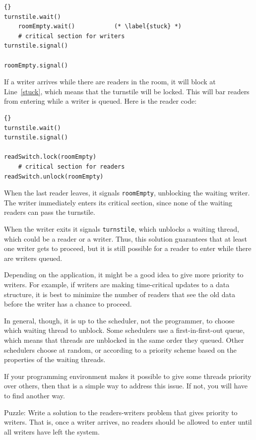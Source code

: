 \documentclass{book}
\begin{document}
\begin{lstlisting}[caption={No-starve writer solution}]{}
turnstile.wait()
    roomEmpty.wait()           (* \label{stuck} *)
    # critical section for writers
turnstile.signal()

roomEmpty.signal()
\end{lstlisting}

If a writer arrives while there are readers in the room, it
will block at Line~\ref{stuck}, which means that the turnstile will
be locked.  This will bar readers from entering while a writer
is queued.  Here is the reader code:

\begin{lstlisting}[caption={No-starve reader solution}]{}
turnstile.wait()
turnstile.signal()

readSwitch.lock(roomEmpty)
    # critical section for readers
readSwitch.unlock(roomEmpty)
\end{lstlisting}

When the last reader leaves, it signals {\tt roomEmpty},
unblocking the waiting writer.  The writer immediately
enters its critical section, since none of the waiting
readers can pass the turnstile.

When the writer exits it signals {\tt turnstile}, which unblocks a
waiting thread, which could be a reader or a writer.  Thus, this
solution guarantees that at least one writer gets to proceed, but it
is still possible for a reader to enter while there are writers
queued.  

Depending on the application, it might be a good idea to
give more priority to writers.  For example, if writers are making
time-critical updates to a data structure, it is best
to minimize the number of readers that see the old data before
the writer has a chance to proceed.

In general, though, it is up to the scheduler, not the programmer,
to choose which waiting thread to unblock.
Some schedulers use a first-in-first-out queue, which means
that threads are unblocked in the same order they queued.
Other schedulers choose at random, or according to
a priority scheme based on the properties of the waiting
threads.

If your programming environment makes it possible to give
some threads priority over others, then that is a simple way
to address this issue.  If not, you will have to find another
way.

Puzzle: Write a solution to the readers-writers problem that gives
priority to writers.  That is, once a writer arrives, no readers
should be allowed to enter until all writers have left the system.
\end{document}

